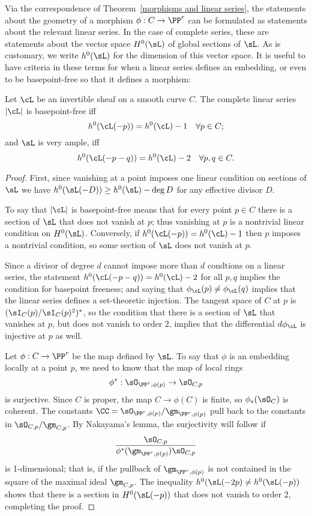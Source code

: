 Via the correspondence of Theorem~\ref{morphisms and linear series}, the statements about the geometry of a morphism $\phi : C \to \PP^r$ can be formulated as statements about the relevant linear series. In the case of complete series, these are statements about the vector space $H^{0}(\sL)$ of global sections of $\sL$. As is customary, we write $h^{0}(\sL)$ for the dimension of this vector space. It is useful to have criteria
in these terms for when a linear series defines an embedding, or even to be basepoint-free so that it
defines a morphism:

\begin{proposition}\label{very ample}\cite[Thm. IV.3.1]{H}
Let $\cL$ be an invertible sheaf on a smooth curve $C$. The complete linear series $|\cL|$ is basepoint-free iff
$$
h^0(\cL(-p)) = h^0(\cL) - 1 \quad \forall p \in C;
$$
and $\sL$ is very ample, iff
$$
h^0(\cL(-p-q)) = h^0(\cL) - 2 \quad \forall p, q \in C.
$$
\end{proposition} 

\begin{proof}
First, since vanishing at a point imposes one linear condition on sections of $\sL$ we have $h^0(\sL(-D)) \geq h^0(\sL)-\deg D$ for any
effective divisor $D$.

To say that $|\cL|$ is basepoint-free means that for every point $p\in C$ there is a section of $\sL$ that does not vanish at $p$; thus vanishing
at $p$ is a nontrivial linear condition on $H^0(\sL)$. Conversely, if $h^0(\cL(-p)) = h^0(\cL) - 1$ then $p$ imposes a nontrivial condition, so
some section of $\sL$ does not vanish at $p$.

Since a divisor of degree $d$ cannot impose more than $d$ condtions on a linear series, the statement $h^0(\cL(-p-q)) = h^0(\cL) - 2$ for all $p, q$ implies the condition for basepoint freeness; and saying that $\phi_\cL(p) \neq \phi_\cL(q)$ implies that the linear series defines a set-theoretic injection. The tangent space of $C$ at $p$ is $(\sI_C(p)/\sI_C(p)^2)^*$, so the condition that there is a section of $\sL$ that vanishes at $p$, but does not vanish
to order 2, implies that the differential $d\phi_\cL$ is injective at $p$ as well.

Let $\phi:C \to \PP^r$ be the map defined by $\sL$. To say that $\phi$  is an embedding locally at a point $p$, we need to know that the map of local rings
$$
\phi^*: \sO_{\PP^r,\phi(p)} \to \sO_{C,p} 
$$
is surjective. Since $C$ is proper, the map $C\to \phi(C)$ is finite,
so $\phi_*(\sO_{C})$ is coherent.
 The constants  $\CC =\sO_{\PP^r,\phi(p)}/\gm_{\PP^r,\phi(p)}$ pull back to the constants in
$\sO_{C,p}/\gm_{C,p}$. 
By Nakayama's lemma, the surjectivity will follow if 
$$
\frac{\sO_{C,p}}
{\phi^*(\gm_{\PP^r,\phi(p)})  \sO_{C,p}}
$$
is 1-dimensional; that is, if  the pullback of $\gm_{\PP^r,\phi(p)}$ is not contained in the square of the
maximal ideal $\gm_{C,p}$. The inequality $h^0(\sL(-2p) \neq h^0(\sL(-p))$ shows that there is a 
section in $H^0(\sL(-p))$ that does not vanish to order 2, completing the proof.
\end{proof}


